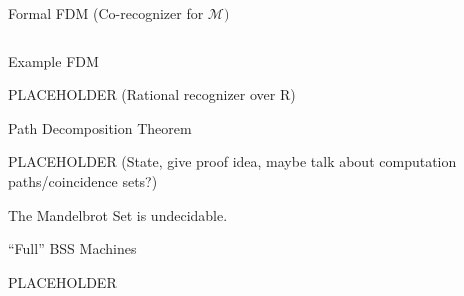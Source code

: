 \documentclass[c]{beamer}
\begin{document}

\begin{frame}{Formal FDM (Co-recognizer for $\mathcal{M})$}
  
  \begin{columns}
    \begin{center}
      \scaletopagewidth[.9]{\mandlegend{}}
    \end{center}
    
    \begin{center}
      \scaletopagewidth[.9]{\mandelrecfull{}}
    \end{center}


  \end{columns}

\end{frame}

\begin{frame}{Example FDM}
  
  PLACEHOLDER (Rational recognizer over R)
 
\end{frame}

\begin{frame}{Path Decomposition Theorem}

  PLACEHOLDER (State, give proof idea, maybe talk about computation
  paths/coincidence sets?)
  
\end{frame}

\begin{frame}
  \begin{corollary}
    The Mandelbrot Set is undecidable.
  \end{corollary}
\end{frame}

\begin{frame}{``Full'' BSS Machines}

  PLACEHOLDER

\end{frame}
\end{document}
